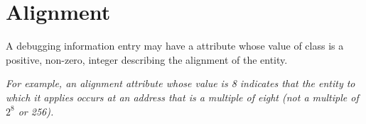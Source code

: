 \section{Alignment}
\label{chap:alignment}
A debugging information entry may have a 
\DWATalignmentDEFN{} attribute
whose value of class \CLASSconstant{} is
a positive, non-zero, integer describing the 
alignment of the entity. 

\textit{For example, an alignment attribute whose value is 8 indicates
that the entity to which it applies occurs at an address that is a
multiple of eight (not a multiple of $2^8$ or 256).}

